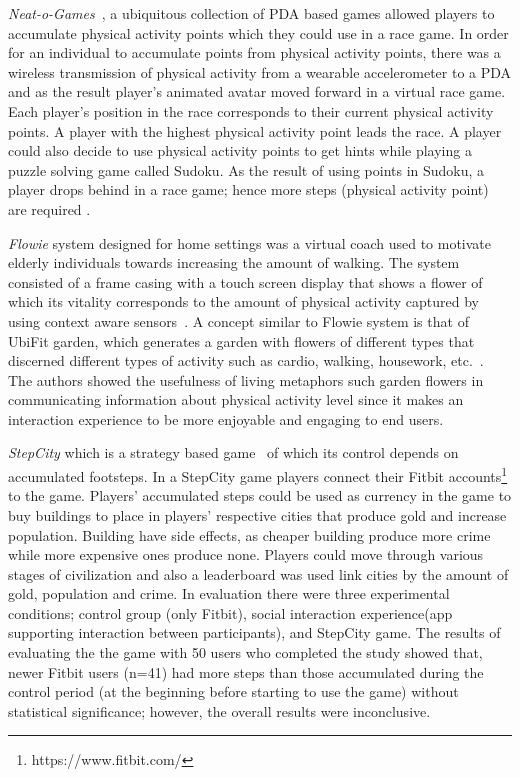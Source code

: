 \emph{{Neat-o-Games}}~\citep{fujiki2008neat}, a ubiquitous collection of PDA based games allowed players to accumulate physical activity points which they could use in a race game. In order for an individual to accumulate points from physical activity points, there was a wireless transmission of physical activity from a wearable accelerometer to a PDA and as the result player's animated avatar moved forward in a virtual race game. Each player's position in the race corresponds to their current physical activity points. A player with the highest physical activity point leads the race. A player could also decide to use physical activity points to get hints while playing a puzzle solving game called Sudoku. As the result of using points in Sudoku, a player drops behind in a race game; hence more steps (physical activity point) are required .

\emph{Flowie} system designed for home settings was a virtual coach used to motivate elderly individuals towards increasing the amount of walking. The system consisted of a frame casing with a touch screen display that shows a flower of which its vitality corresponds to the amount of physical activity captured by using context aware sensors~\citep{albaina2009flowie}. A concept similar to Flowie system is that of UbiFit garden, which generates a garden with flowers of different types that discerned different types of activity such as cardio, walking, housework, etc.~\citep{klasnja2009:using}. The authors showed the usefulness of living metaphors such garden flowers in communicating information about physical activity level since it makes an interaction experience to be more enjoyable and engaging to end users.

\emph{StepCity} which is a strategy based game~\citep{walsh2014stepcity} of which its control depends on accumulated footsteps. In a StepCity game players connect their Fitbit accounts\footnote{https://www.fitbit.com/} to the game. Players' accumulated steps could be used as currency in the game to buy buildings to place in players' respective cities that produce gold and increase population. Building have side effects, as cheaper building produce more crime while more expensive ones produce none. Players could move through various stages of civilization and also a leaderboard was used link cities by the amount of gold, population and crime. In evaluation there were three experimental conditions; control group (only Fitbit), social interaction experience(app supporting interaction between participants), and StepCity game. The results of evaluating the the game with 50 users who completed the study showed that, newer Fitbit users (n=41) had more steps than those accumulated during the control period (at the beginning before starting to use the game) without statistical significance; however, the overall results were inconclusive.  

